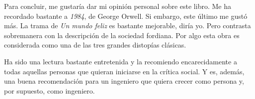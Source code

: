 \documentclass[11pt]{article}
\begin{document}
Para concluir, me gustaría dar mi opinión personal sobre este libro. Me ha recordado bastante a \textit{1984}, de George Orwell. Si embargo, este último me gustó más. La trama de \textit{Un mundo feliz} es bastante mejorable, diría yo. Pero contrasta sobremanera con la descripción de la sociedad fordiana. Por algo esta obra es considerada como una de las tres grandes distopías clásicas.

Ha sido una lectura bastante entretenida y la recomiendo encarecidamente a todas aquellas personas que quieran iniciarse en la crítica social. Y es, además, una buena recomendación para un ingeniero que quiera crecer como persona y, por supuesto, como ingeniero.
\end{document}
